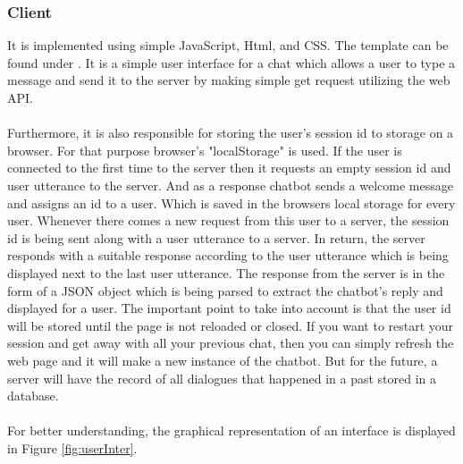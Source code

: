 \subsubsection*{Client}
It is implemented using simple JavaScript, Html, and CSS. The template can be found under \cite{userinterface}. It is a simple user interface for a chat which allows a user to type a message and send it to the server by making simple get request utilizing the web API. 
\\~\\
Furthermore, it is also responsible for storing the user's session id to storage on a browser. For that purpose browser's "localStorage" \cite{localstorage} is used. If the user is connected to the first time to the server then it requests an empty session id and user utterance to the server. And as a response chatbot sends a welcome message and assigns an id to a user. Which is saved in the browsers local storage for every user. Whenever there comes a new request from this user to a server, the session id is being sent along with a user utterance to a server. In return, the server responds with a suitable response according to the user utterance which is being displayed next to the last user utterance. The response from the server is in the form of a JSON object which is being parsed to extract the chatbot's reply and displayed for a user. The important point to take into account is that the user id will be stored until the page is not reloaded or closed. If you want to restart your session and get away with all your previous chat, then you can simply refresh the web page and it will make a new instance of the chatbot. But for the future, a server will have the record of all dialogues that happened in a past stored in a database. 
\\~\\
For better understanding, the graphical representation of an interface is displayed in Figure \ref{fig:userInter}.

